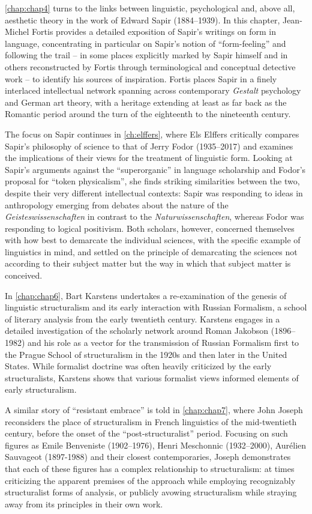 \begin{refsection}
\ref{chap:chap4} turns to the links between linguistic, psychological and, above all, aesthetic theory in the work of Edward Sapir (1884–1939). In this chapter, Jean-Michel Fortis provides a detailed exposition of Sapir's writings on form in language, concentrating in particular on Sapir's notion of ``form-feeling'' and following the trail – in some places explicitly marked by Sapir himself and in others reconstructed by Fortis through terminological and conceptual detective work – to identify his sources of inspiration. Fortis places Sapir in a finely interlaced intellectual network spanning across contemporary \emph{Gestalt} psychology and German art theory, with a heritage extending at least as far back as the Romantic period around the turn of the eighteenth to the nineteenth century.

The focus on Sapir continues in \ref{ch:elffers}, where Els Elffers critically compares Sapir's philosophy of science to that of Jerry Fodor (1935–2017) and examines the implications of their views for the treatment of linguistic form. Looking at Sapir's arguments against the ``superorganic'' in language scholarship and Fodor's proposal for ``token physicalism'', she finds striking similarities between the two, despite their very different intellectual contexts: Sapir was responding to ideas in anthropology emerging from debates about the nature of the \emph{Geisteswissenschaften} in contrast to the \emph{Naturwissenschaften}, whereas Fodor was responding to logical positivism. Both scholars, however, concerned themselves with how best to demarcate the individual sciences, with the specific example of linguistics in mind, and settled on the principle of demarcating the sciences not according to their subject matter but the way in which that subject matter is conceived.

In \ref{chap:chap6}, Bart Karstens undertakes a re-examination of the genesis of linguistic structuralism and its early interaction with Russian Formalism, a school of literary analysis from the early twentieth century. Karstens engages in a detailed investigation of the scholarly network around Roman Jakobson (1896–1982) and his role as a vector for the transmission of Russian Formalism first to the Prague School of structuralism in the 1920s and then later in the United States. While formalist doctrine was often heavily criticized by the early structuralists, Karstens shows that various formalist views informed elements of early structuralism.

A similar story of ``resistant embrace'' is told in \ref{chap:chap7}, where John Joseph reconsiders the place of structuralism in French linguistics of the mid-twentieth century, before the onset of the ``post-structuralist'' period. Focusing on such figures as Emile Benveniste (1902–1976), Henri Meschonnic (1932–2000), Aurélien Sauvageot (1897-1988) and their closest contemporaries, Joseph demonstrates that each of these figures has a complex relationship to structuralism: at times criticizing the apparent premises of the approach while employing recognizably structuralist forms of analysis, or publicly avowing structuralism while straying away from its principles in their own work.


\end{refsection}
